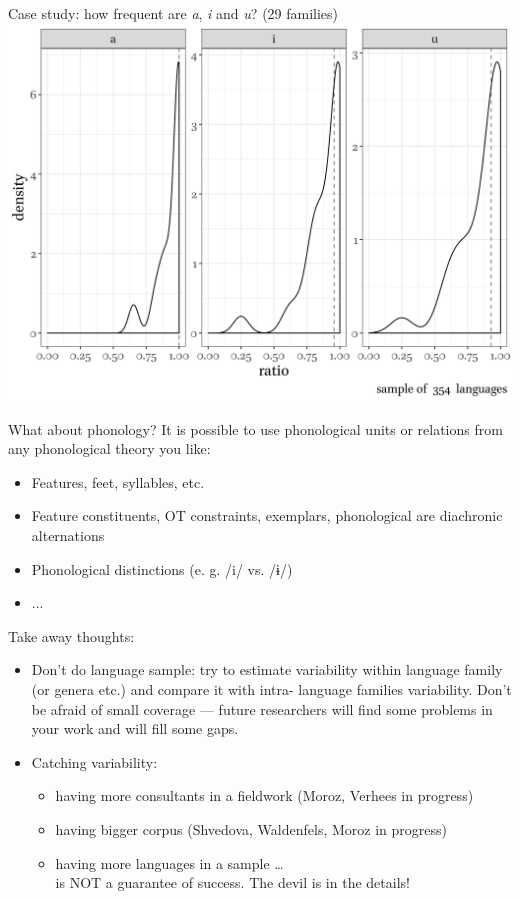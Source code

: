 \documentclass[13pt, t]{beamer}
\begin{document}
\begin{frame}{Case study: how frequent are \textit{a}, \textit{i} and \textit{u}? (29 families)}
\includegraphics[width = \linewidth]{images/08_distributions}
\end{frame}

\begin{frame}{What about phonology?}
It is possible to use phonological units or relations from any phonological theory you like:
\begin{itemize}
\item Features, feet, syllables, etc.
\item Feature constituents, OT constraints, exemplars, phonological are diachronic alternations
\item Phonological distinctions (e. g. /i/ vs. /ɨ/)
\item ...
\end{itemize}
\end{frame}

\begin{frame}{Take away thoughts:}
\begin{itemize}
\item  Don't do language sample: try to estimate variability within language family (or genera etc.) and compare it with intra- language families variability. Don't be afraid of small coverage --- future researchers will find some problems in your work and will fill some gaps.\pause
\item Catching variability:
\begin{itemize}
\item having more consultants in a fieldwork (Moroz, Verhees in progress)
\item having bigger corpus (Shvedova, Waldenfels, Moroz in progress)
\item having more languages in a sample \dots  \pause \\ 
is NOT a guarantee of success. The devil is in the details!
\end{itemize}
\end{itemize}
\end{frame}
\end{document}
